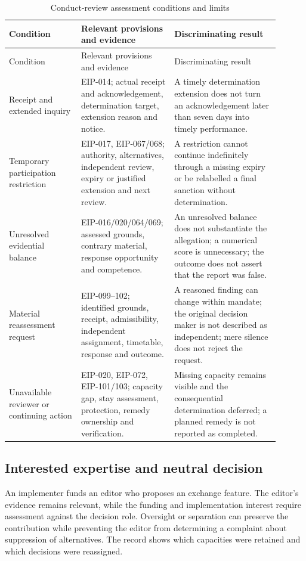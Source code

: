 \documentclass[11pt,a4paper]{article}
\begin{document}
\begin{longtable}{@{}L{0.24\linewidth}L{0.31\linewidth}L{0.35\linewidth}@{}}
\caption{Conduct-review assessment conditions and limits}\label{tab:eip-review-coverage}\\
\toprule
Condition & Relevant provisions and evidence & Discriminating result \\
\midrule\endfirsthead
\toprule
Condition & Relevant provisions and evidence & Discriminating result \\
\midrule\endhead
Receipt and extended inquiry & EIP-014; actual receipt and acknowledgement, determination target, extension reason and notice. & A timely determination extension does not turn an acknowledgement later than seven days into timely performance. \\
Temporary participation restriction & EIP-017, EIP-067/068; authority, alternatives, independent review, expiry or justified extension and next review. & A restriction cannot continue indefinitely through a missing expiry or be relabelled a final sanction without determination. \\
Unresolved evidential balance & EIP-016/020/064/069; assessed grounds, contrary material, response opportunity and competence. & An unresolved balance does not substantiate the allegation; a numerical score is unnecessary; the outcome does not assert that the report was false. \\
Material reassessment request & EIP-099--102; identified grounds, receipt, admissibility, independent assignment, timetable, response and outcome. & A reasoned finding can change within mandate; the original decision maker is not described as independent; mere silence does not reject the request. \\
Unavailable reviewer or continuing action & EIP-020, EIP-072, EIP-101/103; capacity gap, stay assessment, protection, remedy ownership and verification. & Missing capacity remains visible and the consequential determination deferred; a planned remedy is not reported as completed. \\
\bottomrule
\end{longtable}

\subsection{Interested expertise and neutral decision}
An implementer funds an editor who proposes an exchange feature. The editor's evidence remains relevant, while the funding and implementation interest require assessment against the decision role. Oversight or separation can preserve the contribution while preventing the editor from determining a complaint about suppression of alternatives. The record shows which capacities were retained and which decisions were reassigned.
\end{document}
